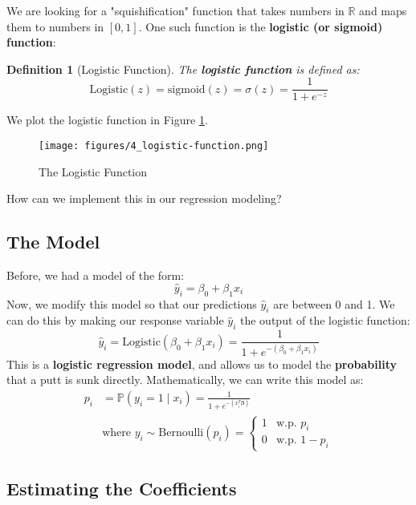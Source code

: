 \documentclass[twoside]{article}
\newtheorem{definition}[theorem]{Definition}
\theoremstyle{definition}
\renewcommand{\P}{\mathbb{P}}
\begin{document}
We are looking for a "squishification" function that takes numbers in $\mathbb{R}$ and maps them to numbers in $[0, 1]$. One such function is the \textbf{logistic  (or sigmoid) function}:
\begin{definition}[Logistic Function]
    The \textbf{logistic function} is defined as:
    \begin{equation}
        \text{Logistic}(z) = \text{sigmoid}(z) = \sigma(z) = \frac{1}{1 + e^{-z}}
    \end{equation}
\end{definition}
We plot the logistic function in Figure \ref{fig:logistic-function}.
\begin{figure}[H]
    \centering
    \texttt{[image: figures/4\_logistic-function.png]}
    \caption{The Logistic Function}
    \label{fig:logistic-function}
\end{figure}
How can we implement this in our regression modeling?

\subsection{The Model}

Before, we had a model of the form:
\begin{equation}
    \widehat{y}_i = \beta_0 + \beta_1 x_i
\end{equation}
Now, we modify this model so that our predictions $\widehat{y}_i$ are between 0 and 1. We can do this by making our response variable $\widehat{y}_i$ the output of the logistic function:
\begin{equation}
    \widehat{y}_i = \text{Logistic}(\beta_0 + \beta_1 x_i) = \frac{1}{1 + e^{-(\beta_0 + \beta_1 x_i)}}
\end{equation}
This is a \textbf{logistic regression model}, and allows us to model the \textbf{probability} that a putt is sunk directly. Mathematically, we can write this model as:
\begin{align}
    p_i &= \P(y_i = 1 \mid x_i) = \frac{1}{1 + e^{-(x_i^T\boldsymbol{\beta})}} \\
    &\text{where } y_i \sim \text{Bernoulli}(p_i )= \begin{cases}
        1 & \text{w.p. } p_i \\
        0 & \text{w.p. } 1-p_i
    \end{cases}
\end{align}

\subsection{Estimating the Coefficients}
\end{document}

